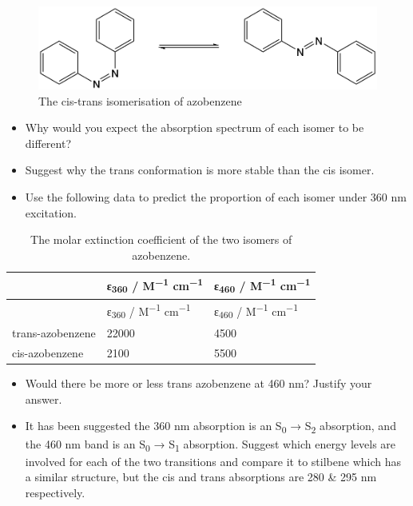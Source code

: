 \documentclass[
]{book}
\begin{document}
\begin{figure}

{\centering \includegraphics[width=0.7\linewidth]{images/cistransazobenzene} 

}

\caption{The cis-trans isomerisation of azobenzene}\label{fig:cistransazobenzene}
\end{figure}

\begin{itemize}
\item
  Why would you expect the absorption spectrum of each isomer to be different?
\item
  Suggest why the trans conformation is more stable than the cis isomer.
\item
  Use the following data to predict the proportion of each isomer under 360 nm excitation.
\end{itemize}

\begin{longtable}[]{@{}lll@{}}
\caption{\label{tab:azobenzeneabs} The molar extinction coefficient of the two isomers of azobenzene.}\tabularnewline
\toprule
& ε\textsubscript{360} / M\textsuperscript{−1} cm\textsuperscript{−1} & ε\textsubscript{460} / M\textsuperscript{−1} cm\textsuperscript{−1}\tabularnewline
\midrule
\endfirsthead
\toprule
& ε\textsubscript{360} / M\textsuperscript{−1} cm\textsuperscript{−1} & ε\textsubscript{460} / M\textsuperscript{−1} cm\textsuperscript{−1}\tabularnewline
\midrule
\endhead
trans-azobenzene & 22000 & 4500\tabularnewline
cis-azobenzene & 2100 & 5500\tabularnewline
\bottomrule
\end{longtable}

\begin{itemize}
\item
  Would there be more or less trans azobenzene at 460 nm? Justify your answer.
\item
  It has been suggested the 360 nm absorption is an S\textsubscript{0} → S\textsubscript{2} absorption, and the 460 nm band is an S\textsubscript{0} → S\textsubscript{1} absorption. Suggest which energy levels are involved for each of the two transitions and compare it to stilbene which has a similar structure, but the cis and trans absorptions are 280 \& 295 nm respectively.
\end{itemize}
\end{document}
